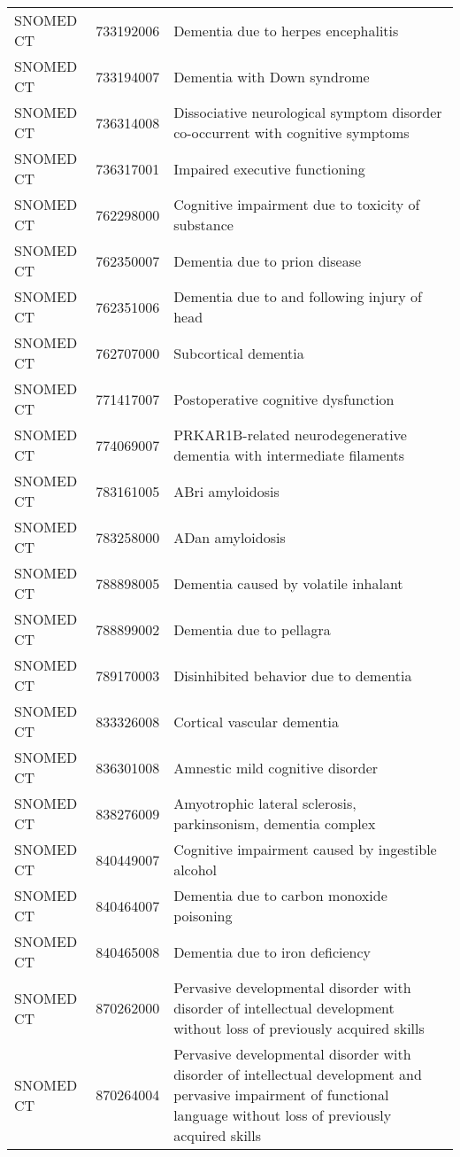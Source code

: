 \begin{longtable}{p{}p{}p{}}
  SNOMED CT & 733192006 & Dementia due to herpes encephalitis \\ 
  SNOMED CT & 733194007 & Dementia with Down syndrome \\ 
  SNOMED CT & 736314008 & Dissociative neurological symptom disorder co-occurrent with cognitive symptoms \\ 
  SNOMED CT & 736317001 & Impaired executive functioning \\ 
  SNOMED CT & 762298000 & Cognitive impairment due to toxicity of substance \\ 
  SNOMED CT & 762350007 & Dementia due to prion disease \\ 
  SNOMED CT & 762351006 & Dementia due to and following injury of head \\ 
  SNOMED CT & 762707000 & Subcortical dementia \\ 
  SNOMED CT & 771417007 & Postoperative cognitive dysfunction \\ 
  SNOMED CT & 774069007 & PRKAR1B-related neurodegenerative dementia with intermediate filaments \\ 
  SNOMED CT & 783161005 & ABri amyloidosis \\ 
  SNOMED CT & 783258000 & ADan amyloidosis \\ 
  SNOMED CT & 788898005 & Dementia caused by volatile inhalant \\ 
  SNOMED CT & 788899002 & Dementia due to pellagra \\ 
  SNOMED CT & 789170003 & Disinhibited behavior due to dementia \\ 
  SNOMED CT & 833326008 & Cortical vascular dementia \\ 
  SNOMED CT & 836301008 & Amnestic mild cognitive disorder \\ 
  SNOMED CT & 838276009 & Amyotrophic lateral sclerosis, parkinsonism, dementia complex \\ 
  SNOMED CT & 840449007 & Cognitive impairment caused by ingestible alcohol \\ 
  SNOMED CT & 840464007 & Dementia due to carbon monoxide poisoning \\ 
  SNOMED CT & 840465008 & Dementia due to iron deficiency \\ 
  SNOMED CT & 870262000 & Pervasive developmental disorder with disorder of intellectual development without loss of previously acquired skills \\ 
  SNOMED CT & 870264004 & Pervasive developmental disorder with disorder of intellectual development and pervasive impairment of functional language without loss of previously acquired skills \\ 

\end{longtable}
